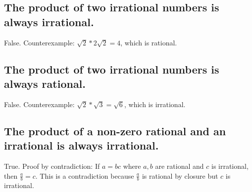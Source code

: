 \documentclass[12pt]{article}
\begin{document}
\subsection{The product of two irrational numbers is always irrational.}
False. Counterexample: $\sqrt{2} * 2 \sqrt{2} = 4$, which is rational.

\subsection{The product of two irrational numbers is always rational.}
False. Counterexample: $\sqrt{2} * \sqrt{3} = \sqrt{6}$, which is irrational.

\subsection{The product of a non-zero rational and an irrational is always irrational.}
True. Proof by contradiction: If $a = bc$ where $a,b$ are rational and $c$ is irrational, then $\frac{a}{b} = c$.
This is a contradiction because $\frac{a}{b}$ is rational by closure but $c$ is irrational.
\end{document}
